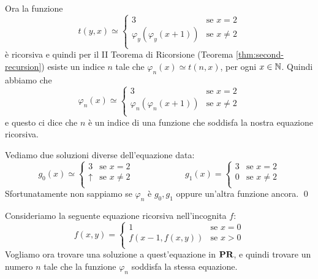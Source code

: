 \documentclass[runningheads,a4paper]{llncs}
\begin{document}
\begin{solution}
Ora la funzione 
$$
t(y,x) \simeq 
\begin{cases}
3 & \mbox{se $x = 2$} \\
\varphi_y(\varphi_y(x+1)) & \mbox{se $x \neq 2$} \\
\end{cases}
$$
\`{e} ricorsiva e quindi per il II Teorema di Ricorsione (Teorema \ref{thm:second-recursion}) esiste un indice
 $n$ tale che $\varphi_{n}(x) \simeq t(n,x)$, per ogni $x \in \mathbb{N}$. Quindi abbiamo che
$$
\varphi_{n}(x)\simeq
\begin{cases}
3 & \mbox{se $x = 2$} \\
\varphi_n(\varphi_n(x+1)) & \mbox{se $x \neq 2$} \\
\end{cases}
$$
e questo ci dice che $n$ \`{e} un indice di una funzione che soddisfa la nostra equazione ricorsiva.

Vediamo due soluzioni diverse dell'equazione data:
$$
g_0(x) \simeq 
\begin{cases}
3        & \mbox{se $x = 2$} \\
\uparrow & \mbox{se $x \neq 2$} \\
\end{cases}
\qquad  \qquad \qquad
g_1(x) = 
\begin{cases}
3             & \mbox{se $x = 2$} \\
0             & \mbox{se $x \neq 2$} \\
\end{cases}
$$
Sfortunatamente non sappiamo se $\varphi_n$ \`{e} $g_0,g_1$ oppure un'altra funzione ancora.
\qed\end{solution}

\begin{exercise}
Consideriamo la seguente equazione ricorsiva nell'incognita $f$:
$$
f(x,y) = 
\begin{cases}
1         & \mbox{se $x = 0$} \\
f(x-1,f(x,y)) & \mbox{se $x >0$} \\
\end{cases}
$$
Vogliamo ora trovare una soluzione a quest'equazione in $\mathbf{PR}$, e quindi trovare un numero $n$ tale che la funzione $\varphi_n$
 soddisfa la stessa equazione.
\end{exercise}
\end{document}
